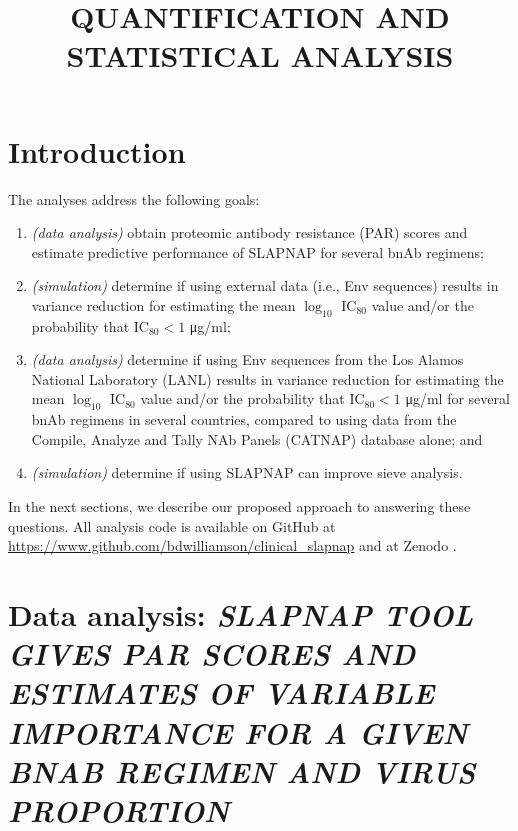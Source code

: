 \documentclass[10pt]{article}
\author{}
\title{\textbf{QUANTIFICATION AND STATISTICAL ANALYSIS}}
\date{}
\begin{document}
\maketitle

\section*{Introduction}


The analyses address the following goals:
\begin{enumerate}
    \item \textit{(data analysis)} obtain proteomic antibody resistance (PAR) scores and estimate predictive performance of SLAPNAP \citep{williamson2021} for several bnAb regimens;
    \item \textit{(simulation)} determine if using external data (i.e., Env sequences) results in variance reduction for estimating the mean $\log_{10}$ IC$_{80}$ value and/or the probability that IC$_{80} < 1$ \si{\ug}/ml;
    \item \textit{(data analysis)} determine if using Env sequences from the Los Alamos National Laboratory (LANL) results in variance reduction for estimating the mean $\log_{10}$ IC$_{80}$ value and/or the probability that IC$_{80} < 1$ \si{\ug}/ml for several bnAb regimens in several countries, compared to using data from the Compile, Analyze and Tally NAb Panels (CATNAP) database \citep{yoon2015} alone; and
    \item \textit{(simulation)} determine if using SLAPNAP can improve sieve analysis.
\end{enumerate}
In the next sections, we describe our proposed approach to answering these questions. All analysis code is available on GitHub at \url{https://www.github.com/bdwilliamson/clinical\_slapnap} and at Zenodo \citep{williamson2022}.

\section*{Data analysis: \textit{SLAPNAP TOOL GIVES PAR SCORES AND ESTIMATES OF VARIABLE IMPORTANCE FOR A GIVEN BNAB REGIMEN AND VIRUS PROPORTION}}\label{sec:par_scores}
\end{document}

